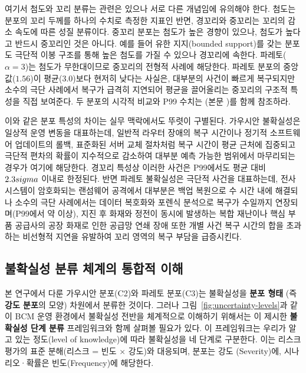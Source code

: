 여기서 첨도와 꼬리 분류는 관련은 있으나 서로 다른 개념임에 유의해야 한다.
첨도는 분포의 꼬리 두께를 하나의 수치로 측정한 지표인 반면, 경꼬리와 중꼬리는
꼬리의 감소 속도에 따른 성질 분류이다. 중꼬리 분포는 첨도가 높은 경향이 있으나,
첨도가 높다고 반드시 중꼬리인 것은 아니다. 예를 들어 유한 지지(bounded support)를
갖는 분포도 극단적 이봉 구조를 통해 높은 첨도를 가질 수 있으나 경꼬리에 속한다.
파레토($\alpha=3$)는 첨도가 무한대이므로 중꼬리의 전형적 사례에 해당한다.
파레토 분포의 중앙값($1.56$)이 평균($3.0$)보다 현저히 낮다는 사실은, 대부분의 사건이
빠르게 복구되지만 소수의 극단 사례에서 복구가 급격히 지연되어 평균을 끌어올리는
중꼬리의 구조적 특성을 직접 보여준다. 두 분포의 시각적 비교와 P99 수치는
(본문 )를 함께 참조하라.

이와 같은 분포 특성의 차이는 실무 맥락에서도 뚜렷이 구별된다. 가우시안 불확실성은
일상적 운영 변동을 대표하는데, 일반적 라우터 장애의 복구 시간이나 정기적 소프트웨어
업데이트의 롤백, 표준화된 서버 교체 절차처럼 복구 시간이 평균 근처에 집중되고
극단적 편차의 확률이 지수적으로 감소하여 대부분 예측 가능한 범위에서 마무리되는
경우가 여기에 해당한다. 경꼬리 특성상 이러한 사건은 P99에서도 평균 대비
$\erf{2.3}{2.33}\sigma$ 이내로 한정된다. 반면 파레토 불확실성은 극단적 사건을 대표하는데,
전사 시스템이 암호화되는 랜섬웨어 공격에서 대부분은 백업 복원으로 수 시간 내에
해결되나 소수의 극단 사례에서는 데이터 복호화와 포렌식 분석으로 복구가 수일까지
연장되며(P99에서 약  이상), 지진 후 화재와 정전이 동시에 발생하는 복합
재난이나 핵심 부품 공급사의 공장 화재로 인한 공급망 연쇄 장애 또한 개별 사건
복구 시간의 합을 초과하는 비선형적 지연을 유발하여 꼬리 영역의 복구 부담을 급증시킨다.


\subsection{불확실성 분류 체계의 통합적 이해}
\label{subsec:uncertainty-classification}

본 연구에서 다룬 가우시안 분포(C2)와 파레토 분포(C3)는 불확실성을 \textbf{분포 형태}
(즉 \textbf{강도 분포}의 모양) 차원에서 분류한 것이다. 그러나 \p{[}그림~\ref{fig:uncertainty-levels}\p{]}과 같이 BCM 운영 환경에서 불확실성 전반을 체계적으로
이해하기 위해서는 \citet{walker2003uncertainty}이 제시한 \textbf{불확실성 단계 분류}
프레임워크와 함께 살펴볼 필요가 있다.
이 프레임워크는 우리가 알고 있는 정도(level of knowledge)에 따라 불확실성을 네 단계로
구분한다. 이는 리스크 평가의 표준 분해(리스크 = 빈도 × 강도)와 대응되며, 분포는 강도
(Severity)에, 시나리오·확률은 빈도(Frequency)에 해당한다. 

